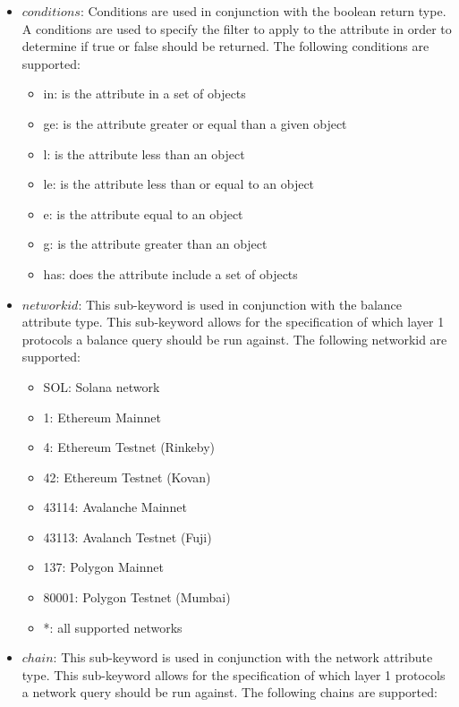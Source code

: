 \begin{itemize}
\begin{itemize}
    \end{itemize}
    \item $conditions$: Conditions are used in conjunction with the boolean return type. A conditions are used to specify the filter to apply to the attribute in order to determine if true or false should be returned. The following conditions are supported:
    \begin{itemize}
        \item in: is the attribute in a set of objects
        \item ge: is the attribute greater or equal than a given object
        \item l: is the attribute less than an object
        \item le: is the attribute less than or equal to an object
        \item e: is the attribute equal to an object
        \item g: is the attribute greater than an object
        \item has: does the attribute include a set of objects
    \end{itemize}
    \item $networkid$: This sub-keyword is used in conjunction with the balance attribute type. This sub-keyword allows for the specification of which layer 1 protocols a balance query should be run against. The following networkid are supported:
    \begin{itemize}
        \item SOL: Solana network
        \item 1: Ethereum Mainnet
        \item 4: Ethereum Testnet (Rinkeby)
        \item 42: Ethereum Testnet (Kovan)
        \item 43114: Avalanche Mainnet 
        \item 43113: Avalanch Testnet (Fuji)
        \item 137: Polygon Mainnet
        \item 80001: Polygon Testnet (Mumbai)
        \item *: all supported networks
    \end{itemize}
    \item $chain$: This sub-keyword is used in conjunction with the network attribute type. This sub-keyword allows for the specification of which layer 1 protocols a network query should be run against. The following chains are supported:
    \begin{itemize}

\end{itemize}
\end{itemize}
